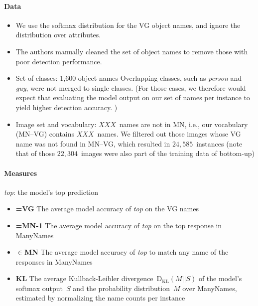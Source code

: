 \paragraph{Data}
\begin{itemize}
	\item We use the softmax distribution for the VG object names, and ignore the distribution over attributes. 
	\item The authors manually cleaned the set of object names to remove those with poor detection performance.
	\item Set of classes: 1,600 object names
	Overlapping classes, such as \textsl{person} and \textsl{guy}, were not merged to single classes. (For those cases, we therefore would expect that evaluating the model output on our set of names per instance to yield higher detection accuracy. )
	\item Image set and vocabulary: $XXX$~names are not in MN, i.e., our vocabulary (MN--VG) contains $XXX$~names. 
	We filtered out those images whose VG name was not found in MN--VG, which resulted in $24,585$~instances (note that of those $22,304$~images were also part of the training data of bottom-up)
\end{itemize} 

\paragraph{Measures}
\textsl{top}: the model's top prediction
\begin{itemize}
	\item \textbf{=VG} The average model accuracy of \textsl{top} on the VG names
	\item \textbf{=MN-1} The average model accuracy of \textsl{top} on the top response in ManyNames
	\item \textbf{$\in$MN} The average model accuracy of \textsl{top} to match any name of the responses in ManyNames
	\item \textbf{KL} The average Kullback-Leibler divergence~$\mathrm{D_{KL}}(M||S)$ of the model's softmax output~$S$ and the  probability distribution~$M$ over ManyNames, estimated by normalizing the name counts per instance
\end{itemize}



